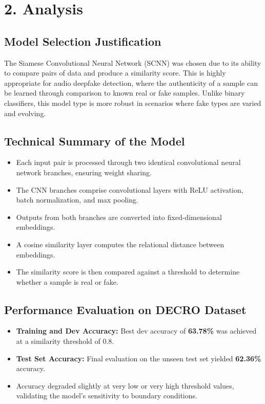 \documentclass{article}
\begin{document}
\section*{2. Analysis}

\subsection*{Model Selection Justification}
The Siamese Convolutional Neural Network (SCNN) was chosen due to its ability to compare pairs of data and produce a similarity score. This is highly appropriate for audio deepfake detection, where the authenticity of a sample can be learned through comparison to known real or fake samples. Unlike binary classifiers, this model type is more robust in scenarios where fake types are varied and evolving.

\subsection*{Technical Summary of the Model}
\begin{itemize}
\item Each input pair is processed through two identical convolutional neural network branches, ensuring weight sharing.
\item The CNN branches comprise convolutional layers with ReLU activation, batch normalization, and max pooling.
\item Outputs from both branches are converted into fixed-dimensional embeddings.
\item A cosine similarity layer computes the relational distance between embeddings.
\item The similarity score is then compared against a threshold to determine whether a sample is real or fake.
\end{itemize}

\subsection*{Performance Evaluation on DECRO Dataset}
\begin{itemize}
\item \textbf{Training and Dev Accuracy:} Best dev accuracy of \textbf{63.78\%} was achieved at a similarity threshold of 0.8.
\item \textbf{Test Set Accuracy:} Final evaluation on the unseen test set yielded \textbf{62.36\%} accuracy.
\item Accuracy degraded slightly at very low or very high threshold values, validating the model's sensitivity to boundary conditions.
\end{itemize}
\end{document}
